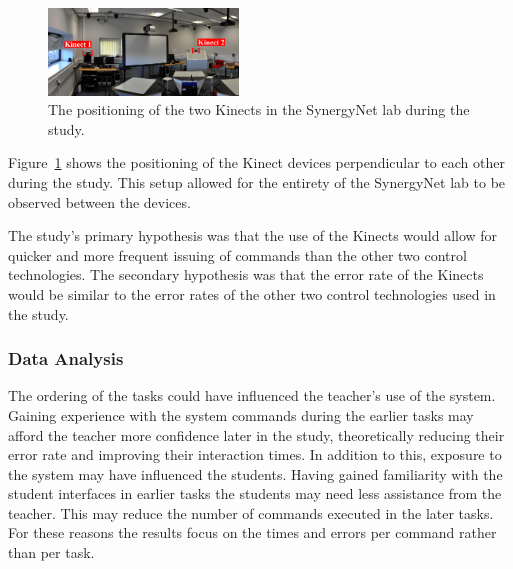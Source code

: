 \documentclass[link]{IWCOMP}
\begin{document}
\begin{figure}[h]
  \centering
  \includegraphics[width=0.45\textwidth]{figures/multiple_kinect_setup.png}
  \caption{The positioning of the two Kinects in the SynergyNet lab during the study.}
  \label{fig:kinectSetup}
\end{figure}

Figure~\ref{fig:kinectSetup} shows the positioning of the Kinect devices perpendicular to each other during the study.
This setup allowed for the entirety of the SynergyNet lab to be observed between the devices.

The study's primary hypothesis was that the use of the Kinects would allow for quicker and more frequent issuing of commands than the other two control technologies.
The secondary hypothesis was that the error rate of the Kinects would be similar to the error rates of the other two control technologies used in the study.

\subsubsection{Data Analysis}
\label{subsec:studyAnalysis}

The ordering of the tasks could have influenced the teacher's use of the system.
Gaining experience with the system commands during the earlier tasks may afford the teacher more confidence later in the study, theoretically reducing their error rate and improving their interaction times.
In addition to this, exposure to the system may have influenced the students.
Having gained familiarity with the student interfaces in earlier tasks the students may need less assistance from the teacher.
This may reduce the number of commands executed in the later tasks.
For these reasons the results focus on the times and errors per command rather than per task.
\end{document}
